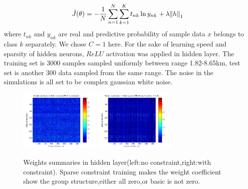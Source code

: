 \begin{equation}
{\kern 1pt} {\kern 1pt} {\kern 1pt} {\kern 1pt} {\kern 1pt} {\kern 1pt} \tilde J(\theta ){\kern 1pt} {\kern 1pt} {\kern 1pt} {\rm{ = }}{\kern 1pt} {\kern 1pt} {\kern 1pt} {\rm{ - }}{{\rm{1}} \over N}\sum\limits_{n = 1}^N {\sum\limits_{k = 1}^K {{t_{nk}}\ln {y_{nk}}{\kern 1pt} {\kern 1pt} {\kern 1pt} {\rm{ + }}{\kern 1pt} {\kern 1pt} \lambda {{\left\| h \right\|}_1}} }
\end{equation}
where $t_{nk}$ and $y_{nk}$ are real and predictive probability of sample data $x$ belongs to class $k$ separately. We chose $C=1$ here.
For the sake of learning speed and sparsity of hidden neurons, $ReLU$ activation was applied in hidden layer.
The training set is 3000 samples sampled uniformly between range 1.82\--8.65km, test set is another 300 data sampled from the same range. The noise in the simulations is all set to be complex gaussian white noise.

\begin{figure}
\includegraphics[width=4cm,height=3cm]{figure/Weights_summaries_in_hidden_laye_swell_exp}
\includegraphics[width=4cm,height=3cm]{figure/Weights_summaries_in_hidden_layer_swell_exp_lambda_2_dot_1e_neg_5}
\caption{Weights summaries in hidden layer(left:no constraint,right:with constraint). Sparse constraint
training makes the weight coefficient show the group structure,either all zero,or basic is not zero.}
\end{figure}

